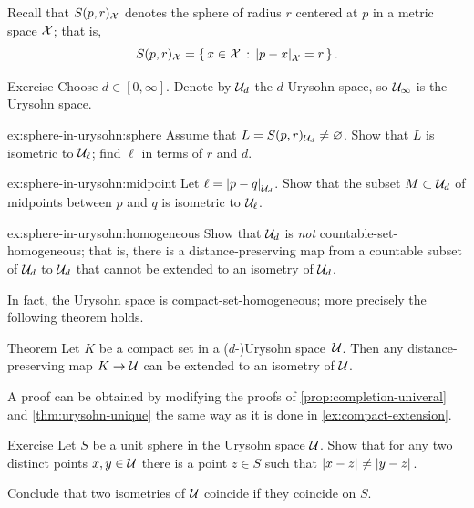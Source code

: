 Recall that $S(p,r)_{\mathcal{X}}$ denotes the sphere of radius $r$ centered at $p$ in a metric space $\mathcal{X}$;
that is, 
$$S(p,r)_{\spc{X}}=\set{x\in \spc{X}}{\dist{p}{x}{\spc{X}}=r}.$$

\begin{thm}{Exercise}\label{ex:sphere-in-urysohn}
Choose $d\in [0,\infty]$.
Denote by $\mathcal{U}_d$ the $d$-Urysohn space,
so $\mathcal{U}_\infty$ is the Urysohn space.

\begin{subthm}{ex:sphere-in-urysohn:sphere}
Assume that $L=S(p,r)_{\mathcal{U}_d}\ne \varnothing$.
Show that $L$ is isometric to $\mathcal{U}_{\ell}$; find $\ell$ in terms of $r$ and $d$.
\end{subthm}

\begin{subthm}{ex:sphere-in-urysohn:midpoint}
Let $\ell=\dist{p}{q}{\spc{U}_d}$.
Show that the subset $M\subset\mathcal{U}_d$ of midpoints between $p$ and $q$ is isometric to $\mathcal{U}_\ell$.
\end{subthm}

\begin{subthm}{ex:sphere-in-urysohn:homogeneous}
Show that $\mathcal{U}_d$ is \emph{not} countable-set-homogeneous;
that is, there is a distance-preserving map from a countable subset of $\mathcal{U}_d$ to $\mathcal{U}_d$ that cannot be extended to an isometry of $\mathcal{U}_d$.
\end{subthm}

\end{thm}

In fact, the Urysohn space is compact-set-homogeneous; more precisely the following theorem holds.

\begin{thm}{Theorem}\label{thm:compact-homogeneous}
Let $K$ be a compact set in a ($d$-)Urysohn space~$\mathcal{U}$.
Then any distance-preserving map $K\to \mathcal{U}$ can be extended to an isometry of $\mathcal{U}$.
\end{thm}

A proof can be obtained by modifying the proofs of \ref{prop:completion-univeral} and \ref{thm:urysohn-unique}
the same way as it is done in \ref{ex:compact-extension}.

\begin{thm}{Exercise}\label{ex:shere}
Let $S$ be a unit sphere in the Urysohn space $\mathcal{U}$.
Show that for any two distinct points $x,y\in \mathcal{U}$ there is a point $z\in S$ such that 
$\dist{x}{z}{}\ne \dist{y}{z}{}$.

Conclude that two isometries of $\mathcal{U}$ coincide if they coincide on $S$.
\end{thm}

